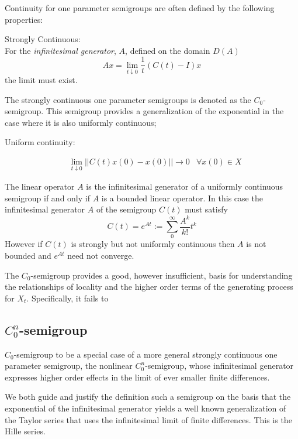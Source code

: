 \documentclass{article}
\begin{document}
Continuity for one parameter semigroups are often defined by the following properties:

\qquad Strongly Continuous: \\

\qquad\qquad For the \textit{infinitesimal generator}, $A$, defined on the domain $D(A)$
\begin{equation}
    Ax =  \lim_{t\downarrow0} \frac{1}{t} (C(t) - I)x \label{eq:continuity}
\end{equation}
\qquad\qquad the limit must exist. 

The strongly continuous one parameter semigroups is denoted as the $C_0$-semigroup. This semigroup provides a generalization of the exponential in the case where it is also uniformly continuous;

\qquad Uniform continuity:

\qquad\qquad
\begin{align}
    &{\lim_{t \downarrow 0} || C(t) x(0) - x(0) || \rightarrow 0}  &\forall x(0) \in X \label{eq:uniformity}
\end{align}

The linear operator $A$ is the infinitesimal generator of a uniformly continuous semigroup if and only if $A$ is a bounded linear operator. In this case the infinitesimal generator $A$ of the semigroup $C(t)$ must satisfy
$$
    C(t) = e^{At} := \sum_0^{\infty} \frac{A^k}{k!} t^k \label{eq:generator}
$$
However if $C(t)$ is strongly but not uniformly continuous then $A$ is not bounded and $e^{At}$ need not converge.

The $C_0$-semigroup provides a good, however insufficient, basis for understanding the relationships of locality and the higher order terms of the generating process for $X_t$. Specifically, it fails to 
\subsection{$C_0^n$-semigroup}

 $C_0$-semigroup to be a special case of a more general strongly continuous one parameter semigroup, the nonlinear $C^n_0$-semigroup, whose infinitesimal generator expresses higher order effects in the limit of ever smaller finite differences. 
 
 We both guide and justify the definition such a semigroup on the basis that the exponential of the infinitesimal generator yields a well known generalization of the Taylor series that uses the infinitesimal limit of finite differences. This is the Hille series. 
 
\end{document}
